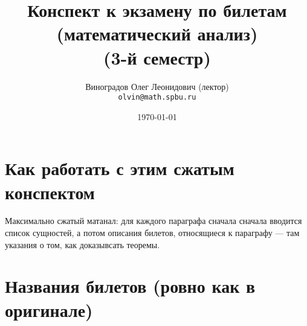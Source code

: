 \documentclass[12pt, a4paper]{book}
\title{Конспект к экзамену по билетам (математический анализ) \\(3-й семестр)}
\author{
  \vova
  \and
  Виноградов Олег Леонидович (лектор)\\
  \texttt{olvin@math.spbu.ru}
}
\date{\today}
\begin{document}
\maketitle
\newpage
\tableofcontents
\newpage


\section{Как работать с этим сжатым конспектом}


Максимально сжатый матанал: 
для каждого параграфа сначала сначала вводится список сущностей, 
а потом описания билетов, относящиеся к параграфу — 
там указания о том, как доказывсать теоремы.

\section{Названия билетов (ровно как в оригинале)}
\end{document}
